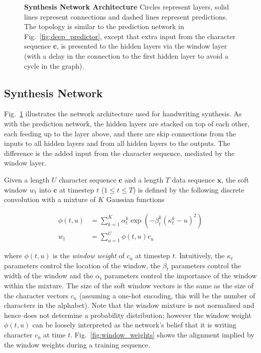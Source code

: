 \begin{figure}
\begin{center}

\end{center}
\caption[Synthesis Network Architecture]{\textbf{Synthesis Network Architecture} Circles represent layers, solid lines represent connections and dashed lines represent predictions. The topology is similar to the prediction network in Fig.~\ref{fig:deep_predictor}, except that extra input from the character sequence $\mathbf{c}$, is presented to the hidden layers via the window layer (with a delay in the connection to the first hidden layer to avoid a cycle in the graph).}
\label{fig:synth_net}
\end{figure}

\subsection{Synthesis Network}

Fig.~\ref{fig:synth_net} illustrates the network architecture used for handwriting synthesis. As with the prediction network, the hidden layers are stacked on top of each other, each feeding up to the layer above, and there are skip connections from the inputs to all hidden layers and from all hidden layers to the outputs. The difference is the added input from the character sequence, mediated by the window layer.

Given a length $U$ character sequence $\mathbf{c}$ and a length $T$ data sequence $\mathbf{x}$, the soft window $w_t$ into $\mathbf{c}$ at timestep $t$ ($1 \leq t \leq T$) is defined by the following discrete convolution with a mixture of $K$ Gaussian functions

\begin{align}
\phi(t, u) &= \sum_{k=1}^K{\alpha^k_t\exp\left(-\beta_t^k\left(\kappa_t^k-u\right)^2\right)}\\
w_t &= \sum_{u=1}^U{\phi(t, u)c_u}
\end{align}

where $\phi(t, u)$ is the \emph{window weight} of $c_u$ at timestep $t$. Intuitively, the $\kappa_t$ parameters control the location of the window, the $\beta_t$ parameters control the width of the window and the $\alpha_t$ parameters control the importance of the window within the mixture. The size of the soft window vectors is the same as the size of the character vectors $c_u$ (assuming a one-hot encoding, this will be the number of characters in the alphabet). Note that the window mixture is not normalised and hence does not determine a probability distribution; however the window weight $\phi(t, u)$ can be loosely interpreted as the network's belief that it is writing character $c_u$ at time $t$.
Fig.~\ref{fig:window_weights} shows the alignment implied by the window weights during a training sequence.

